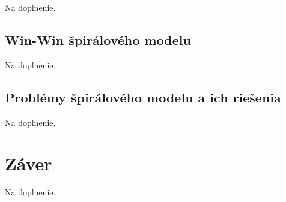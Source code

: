 \documentclass[10pt,twoside,slovak,a4paper]{article}
\begin{document}
Na doplnenie.

\subsection{Win-Win špirálového modelu} \label{winwin:spiralModel}

Na doplnenie.

\subsection{Problémy špirálového modelu a ich riešenia} \label{problems:spiralModel}

Na doplnenie.



\section{Záver} \label{zaver} 
Na doplnenie.





\end{document}
